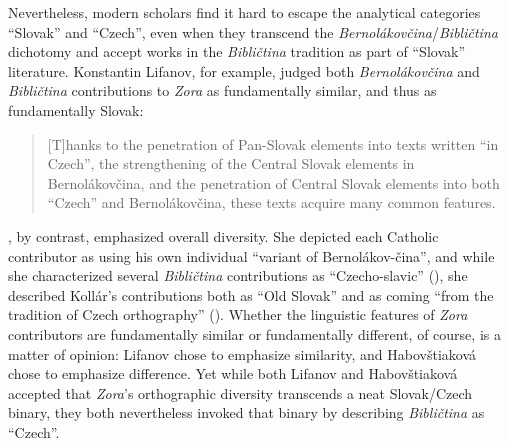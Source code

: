 Nevertheless, modern scholars find it hard to escape the analytical categories “Slovak” and “Czech”, even when they transcend the \textit{Bernolákovčina}/\textit{Bibličtina} dichotomy and accept works in the \textit{Bibličtina} tradition as part of “Slovak” literature. Konstantin Lifanov, for example, judged both \textit{Bernolákovčina} and \textit{Bibličtina} contributions to \textit{Zora} as fundamentally similar, and thus as fundamentally Slovak:

\begin{quote}
    [T]hanks to the penetration of Pan-Slovak elements into texts written “in Czech”, the strengthening of the Central Slovak elements in Berno\-lákovčina, and the penetration of Central Slovak elements into both “Czech” and Ber\-nolákovčina, these texts acquire many common features. \citep[41]{lifanov_almanach_2010}
\end{quote}

\noindent \citet[95]{habovstiakova_almanach_1970}, by contrast, emphasized overall diversity. She depicted each Catholic contributor as using his own individual “variant of Bernolákov-\linebreak{}čina”, and while she characterized several \textit{Bibličtina} contributions as “Czecho-\linebreak{}slavic” (\citeyear[105]{habovstiakova_almanach_1970}), she described Kollár’s contributions both as “Old Slovak” and as coming “from the tradition of Czech orthography” (\citeyear[103]{habovstiakova_almanach_1970}). Whether the linguistic features of \textit{Zora} contributors are fundamentally similar or fundamentally different, of course, is a matter of opinion: Lifanov chose to emphasize similarity, and Habovštiaková chose to emphasize difference. Yet while both Lifanov and Habovštiaková accepted that \textit{Zora}’s orthographic diversity transcends a neat Slovak/Czech binary, they both nevertheless invoked that binary by describing \textit{Bibličtina} as “Czech”.

